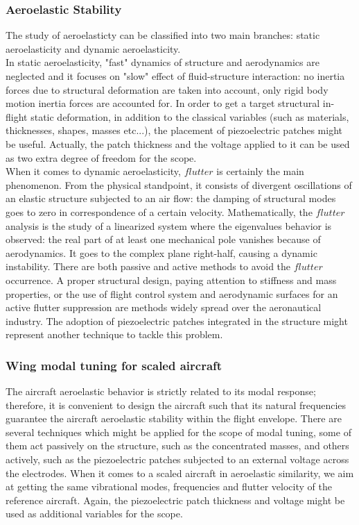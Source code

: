 \documentclass[twocolumn,a4paper,10pt,english]{article}
\begin{document}
        \subsubsection{Aeroelastic Stability}
            The study of aeroelasticty can be classified into two main branches: static aeroelasticity and dynamic aeroelasticity.\\
            In static aeroelasticity, "fast" dynamics of structure and aerodynamics are neglected and it focuses on "slow" effect of fluid-structure interaction: no inertia forces due to structural deformation are taken into account, only rigid body motion inertia forces are accounted for. In order to get a target structural in-flight static deformation, in addition to the classical variables (such as materials, thicknesses, shapes, masses etc...), the placement of piezoelectric patches might be useful. Actually, the patch thickness and the voltage applied to it can be used as two extra degree of freedom for the scope.\\
            When it comes to dynamic aeroelasticity, $flutter$ is certainly the main phenomenon. From the physical standpoint, it consists of divergent oscillations of an elastic structure subjected to an air flow: the damping of structural modes goes to zero in correspondence of a certain velocity. Mathematically, the $flutter$ analysis is the  study of a linearized system where the eigenvalues behavior is observed: the real part of at least one mechanical pole vanishes because of aerodynamics. It goes to the complex plane right-half, causing a dynamic instability. There are both passive and active methods to avoid the $flutter$ occurrence. A proper structural design, paying attention to stiffness and mass properties, or the use of flight control system and aerodynamic surfaces for an active flutter suppression are methods widely spread over the aeronautical industry. The adoption of piezoelectric patches integrated in the structure might represent another technique to tackle this problem.
            
            
        \subsubsection{Wing modal tuning for scaled aircraft}
	        The aircraft aeroelastic behavior is strictly related to its modal response; therefore, it is convenient to design the aircraft such that its natural frequencies guarantee the aircraft aeroelastic stability within the flight envelope. There are several techniques which might be applied for the scope of modal tuning, some of them act passively on the structure, such as the concentrated masses, and others actively, such as the piezoelectric patches subjected to an external voltage across the electrodes. 
	        When it comes to a scaled aircraft in aeroelastic similarity, we aim at getting the same vibrational modes, frequencies and flutter velocity of the reference aircraft. Again, the piezoelectric patch thickness and voltage might be used as additional variables for the scope. 
            
\end{document}
